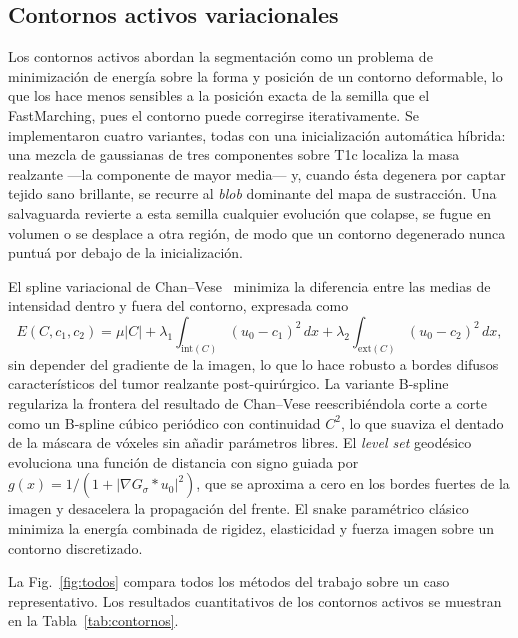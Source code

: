 \documentclass[conference]{IEEEtran}
\begin{document}
\subsection{Contornos activos variacionales}

Los contornos activos abordan la segmentaci\'{o}n como un problema
de minimizaci\'{o}n de energ\'{i}a sobre la forma y posici\'{o}n de
un contorno deformable, lo que los hace menos sensibles a la
posici\'{o}n exacta de la semilla que el FastMarching, pues el
contorno puede corregirse iterativamente.
Se implementaron cuatro variantes, todas con una inicializaci\'{o}n
autom\'{a}tica h\'{i}brida: una mezcla de gaussianas de tres componentes
sobre T1c localiza la masa realzante ---la componente de mayor media--- y,
cuando \'{e}sta degenera por captar tejido sano brillante, se recurre al
\emph{blob} dominante del mapa de sustracci\'{o}n.
Una salvaguarda revierte a esta semilla cualquier evoluci\'{o}n que colapse,
se fugue en volumen o se desplace a otra regi\'{o}n, de modo que un contorno
degenerado nunca puntu\'{a} por debajo de la inicializaci\'{o}n.

El spline variacional de Chan--Vese~\cite{chan2001active} minimiza
la diferencia entre las medias de intensidad dentro y fuera del
contorno, expresada como
\begin{equation}
E(C,c_1,c_2) = \mu|C|
  + \lambda_1\!\int_{\mathrm{int}(C)}\!(u_0-c_1)^2\,dx
  + \lambda_2\!\int_{\mathrm{ext}(C)}\!(u_0-c_2)^2\,dx,
\end{equation}
sin depender del gradiente de la imagen, lo que lo hace robusto a
bordes difusos caracter\'{i}sticos del tumor realzante
post-quir\'{u}rgico.
La variante B-spline regulariza la frontera del resultado de
Chan--Vese reescribi\'{e}ndola corte a corte como un B-spline c\'{u}bico
peri\'{o}dico con continuidad $C^2$, lo que suaviza el dentado de la
m\'{a}scara de v\'{o}xeles sin a\~{n}adir par\'{a}metros libres.
El \textit{level set} geod\'{e}sico~\cite{caselles1997geodesic}
evoluciona una funci\'{o}n de distancia con signo guiada por
$g(x) = 1/(1 + |\nabla G_\sigma \ast u_0|^2)$, que se aproxima a
cero en los bordes fuertes de la imagen y desacelera la
propagaci\'{o}n del frente.
El snake param\'{e}trico cl\'{a}sico minimiza la energ\'{i}a
combinada de rigidez, elasticidad y fuerza imagen sobre un contorno
discretizado.

La Fig.~\ref{fig:todos} compara todos los m\'{e}todos del trabajo
sobre un caso representativo.
Los resultados cuantitativos de los contornos activos se muestran
en la Tabla~\ref{tab:contornos}.
\end{document}
